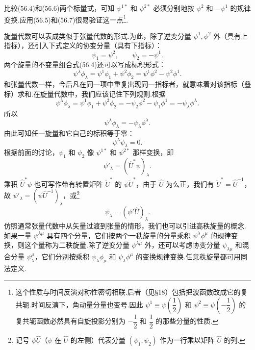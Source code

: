 比较(56.4)和(56.6)两个标量式，可知 $\psi^{1*}$ 和 $\psi^{2*}$ 必须分别地按 $\psi^2$ 和 $-\psi^1$ 的规律变换.应用(56.5)和(56.7)很易验证这一点\footnote{这个性质与时间反演对称性密切相联.后者（见§18）包括把波函数改成它的复共轭.时间反演下，角动量分量也变号.因此 $\psi^1\equiv\psi\left(\dfrac{1}{2}\right)$ 和 $\psi^2\equiv\psi\left(-\dfrac{1}{2}\right)$ 的复共轭函数必然具有自旋投影分别为 $-\dfrac{1}{2}$ 和 $\dfrac{1}{2}$ 的那些分量的性质.}.

旋量代数可以表成类似于张量代数的形式.为此，除了逆变分量 $\psi^1,\psi^2$ 外（具有上指标），还引入下式定义的协变分量（具有下指标）：
\begin{equation}
  \psi_1=\psi^2,\qquad \psi_2=-\psi^1.
\end{equation}
两个旋量的不变量组合式(56.4)还可以写成标积形式：
\begin{equation}
  \psi^{\lambda}\phi_{\lambda}=\psi^1\phi_1+\psi^2\phi_2=\psi^1\phi^2-\psi^2\phi^1.
\end{equation}
和张量代数一样，今后凡在同一项中重复出现同一指标者，就意味着对该指标（叠标）求和.在旋量代数中，我们应该记住下列规则.根据
\begin{equation*}
  \psi^{\lambda}\phi_{\lambda}=\psi^1\phi_1+\psi^2\phi_2
  =-\psi_2\phi^2-\psi_1\phi^1=-\psi_{\lambda}\phi^{\lambda}.
\end{equation*}
所以
\begin{equation}
  \psi^{\lambda}\phi_{\lambda}=-\psi_{\lambda}\phi^{\lambda}.
\end{equation}
由此可知任一旋量和它自己的标积等于零：
\begin{equation}
  \psi^{\lambda}\psi_{\lambda}=0.
\end{equation}
根据前面的讨论，$\psi_1$ 和 $\psi_2$ 像 $\psi^{1*}$ 和 $\psi^{2*}$ 那样变换，即
\begin{equation}
  \psi'_{\lambda}=(\hat{U}^*\psi)_{\lambda}.
\end{equation}
乘积 $\hat{U}^*\psi$ 也可写作带有转置矩阵 $\tilde{U}^*$ 的 $\psi\tilde{U}^*$，由于 $\hat{U}$ 为么正，我们有 $\tilde{U}^*=\hat{U}^{-1}$，故 $\psi'_{\lambda}=(\psi\hat{U}^{-1})_{\lambda}$，或\footnote{记号 $\psi\hat{U}$（$\psi$ 在 $\hat{U}$ 的左侧）代表分量 $(\psi_1,\psi_2)$ 作为一行乘以矩阵 $\hat{U}$ 的列.}
\begin{equation}
  \psi_{\lambda}=(\psi'\hat{U})_{\lambda}.
\end{equation}
仿照通常张量代数中从矢量过渡到张量的情形，我们也可以引进高秩旋量的概念.如果一量 $\psi^{\lambda\mu}$ 具有四个分量，它们按两个一秩旋量的分量乘积 $\psi^{\lambda}\phi^{\mu}$ 的规律变换，则这个量称为二秩旋量.除了逆变分量 $\psi^{\lambda\mu}$ 外，还可以考虑协变分量 $\psi_{\lambda\mu}$ 和混合分量 $\psi^{\mu}_{\lambda}$，它们分别按乘积 $\psi_{\lambda}\phi_{\mu}$ 和 $\psi_{\lambda}\phi^{\mu}$ 的变换规律变换.任意秩旋量都可用同法定义.

